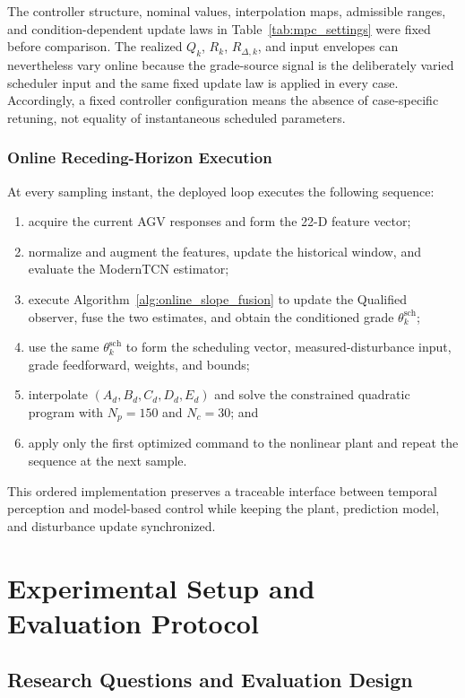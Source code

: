 \documentclass{ieeeaccess}
\begin{document}
The controller structure, nominal values, interpolation maps, admissible ranges, and condition-dependent update laws in Table~\ref{tab:mpc_settings} were fixed before comparison. The realized $Q_k$, $R_k$, $R_{\Delta,k}$, and input envelopes can nevertheless vary online because the grade-source signal is the deliberately varied scheduler input and the same fixed update law is applied in every case. Accordingly, a fixed controller configuration means the absence of case-specific retuning, not equality of instantaneous scheduled parameters.

\subsubsection{Online Receding-Horizon Execution}

At every sampling instant, the deployed loop executes the following sequence:
\begin{enumerate}
\item acquire the current AGV responses and form the 22-D feature vector;
\item normalize and augment the features, update the historical window, and evaluate the ModernTCN estimator;
\item execute Algorithm~\ref{alg:online_slope_fusion} to update the Qualified observer, fuse the two estimates, and obtain the conditioned grade $\theta_k^{\mathrm{sch}}$;
\item use the same $\theta^{\mathrm{sch}}_k$ to form the scheduling vector, measured-disturbance input, grade feedforward, weights, and bounds;
\item interpolate $(A_d,B_d,C_d,D_d,E_d)$ and solve the constrained quadratic program with $N_p=150$ and $N_c=30$; and
\item apply only the first optimized command to the nonlinear plant and repeat the sequence at the next sample.
\end{enumerate}
This ordered implementation preserves a traceable interface between temporal perception and model-based control while keeping the plant, prediction model, and disturbance update synchronized.

\section{Experimental Setup and Evaluation Protocol}
\label{sec:experiment_design}

\subsection{Research Questions and Evaluation Design}
\end{document}
